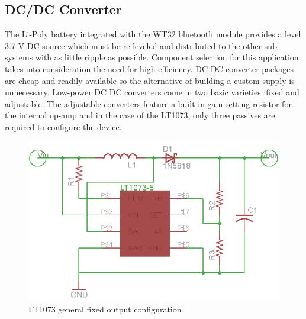 \subsection{DC/DC Converter}

The Li-Poly battery integrated with the WT32 bluetooth module provides a level 3.7 V DC source which must be re-leveled and distributed to the other sub-systems with as little ripple as possible. Component selection for this application takes into consideration the need for high efficiency. DC-DC converter packages are cheap and readily available so the alternative of building a custom supply is unnecessary. Low-power DC DC converters come in two basic varieties: fixed and adjustable. The adjustable converters feature a built-in gain setting resistor for the internal op-amp and in the case of the LT1073, only three passives are required to configure the device.\hline 


\begin{figure}[hbp]
\centering
\includegraphics[scale=0.5]{power_gen_fixed.png}
\caption[LT1073 Fixed Output Configuration]{LT1073 general fixed output configuration\cite{ds:lt1073}}
\end{figure}
